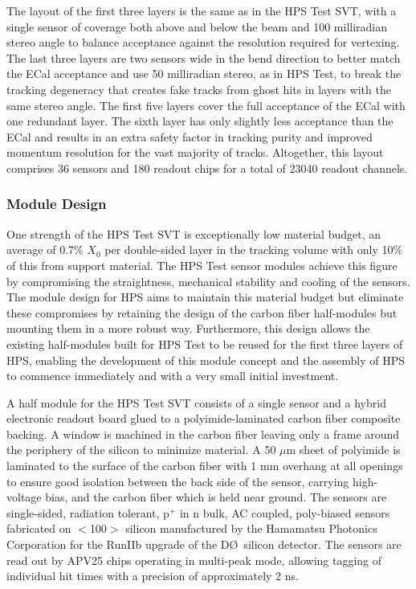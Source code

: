 The layout of the first three layers is the same as in the HPS Test SVT, with a single sensor of coverage both above and below the beam and 100 milliradian stereo angle to balance acceptance against the resolution required for vertexing.  The last three layers are two sensors wide in the bend direction to better match the ECal acceptance and use 50 milliradian stereo, as in HPS Test, to break the tracking degeneracy that creates fake tracks from ghost hits in layers with the same stereo angle.  The first five layers cover the full acceptance of the ECal with one redundant layer.  The sixth layer has only slightly less acceptance than the ECal and results in an extra safety factor in tracking purity and improved momentum resolution for the vast majority of tracks.  Altogether, this layout comprises 36 sensors and 180 readout chips for a total of 23040 readout channels.

\subsubsection{Module Design}

One strength of the HPS Test SVT is exceptionally low material budget, an average of 0.7\% $X_0$ per double-sided layer in the tracking volume with only 10\% of this from support material.  The HPS Test sensor modules achieve this figure by compromising the straightness, mechanical stability and cooling of the sensors.  The module design for HPS aims to maintain this material budget but eliminate these compromises by retaining the design of the carbon fiber half-modules but mounting them in a more robust way. Furthermore, this design allows the existing half-modules built for HPS Test to be reused for the first three layers of HPS, enabling the development of this module concept and the assembly of HPS to commence immediately and with a very small initial investment. 

A half module for the HPS Test SVT consists of a single sensor and a hybrid electronic readout board glued to a polyimide-laminated carbon fiber composite backing.  A window is machined in the carbon fiber leaving only a frame around the periphery of the silicon to minimize material. A 50 $\mu$m sheet of polyimide is laminated to the surface of the carbon fiber with 1 mm overhang at all openings to ensure good isolation between the back side of the sensor, carrying high-voltage bias, and the carbon fiber which is held near ground.  The sensors are single-sided, radiation tolerant, p$^+$ in n bulk, AC coupled, poly-biased sensors fabricated on $<$100$>$ silicon manufactured by the Hamamatsu Photonics Corporation for the RunIIb upgrade of the D\O\ silicon detector. The sensors are read out by APV25 chips operating in multi-peak mode, allowing tagging of individual hit times with a precision of approximately 2 ns.

